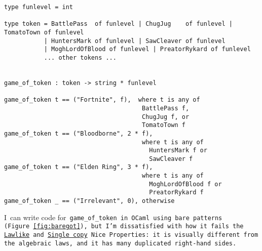 \documentclass[manuscript,screen 12pt, nonacm]{acmart}
\begin{document}
\begin{minipage}[t]{\textwidth}
    \centering 
    \begin{footnotesize}
      \begin{verbatim}  
type funlevel = int

type token = BattlePass  of funlevel | ChugJug    of funlevel | TomatoTown of funlevel
           | HuntersMark of funlevel | SawCleaver of funlevel
           | MoghLordOfBlood of funlevel | PreatorRykard of funlevel
           ... other tokens ...
                    

game_of_token : token -> string * funlevel

game_of_token t == ("Fortnite", f),  where t is any of 
                                      BattlePass f, 
                                      ChugJug f, or
                                      TomatoTown f
game_of_token t == ("Bloodborne", 2 * f), 
                                      where t is any of 
                                        HuntersMark f or 
                                        SawCleaver f
game_of_token t == ("Elden Ring", 3 * f), 
                                      where t is any of 
                                        MoghLordOfBlood f or  
                                        PreatorRykard f
game_of_token _ == ("Irrelevant", 0), otherwise
      \end{verbatim}
    \end{footnotesize}
  \end{minipage}  
        
        I~can write code for~\tt{game\_of\_token} in OCaml using bare patterns
        (Figure~\ref{fig:baregot}), but I'm dissatisfied with how it fails the
        \hyperref[p1]{Lawlike} and~\hyperref[p2]{Single copy} Nice~Properties:
        it is visually different from the algebraic laws, and it has many
        duplicated right-hand sides.
        
\end{document}
